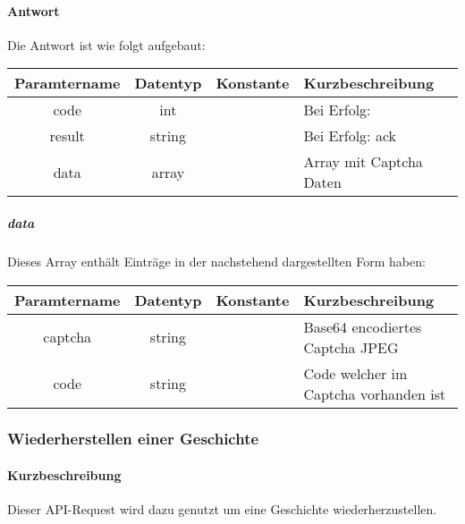 \paragraph{Antwort}Die Antwort ist wie folgt aufgebaut:
\begin{table}[H]
	\begin{tabular}{|c|c|c|p{6.5cm}|}
		\hline
		\textbf{Paramtername} & \textbf{Datentyp} & \textbf{Konstante} & \textbf{Kurzbeschreibung}            \\ \hline                
		code                & int              &                 & Bei Erfolg: {\glqq 0\grqq} \\ \hline
		result              & string           &                 & Bei Erfolg: {\glqq ack\grqq} \\ \hline
		data                & array            &                 & Array mit Captcha Daten \\ \hline
	\end{tabular}
\end{table}
\subparagraph{data}Dieses Array enthält Einträge in der nachstehend dargestellten Form haben:
\begin{table}[H]
	\begin{tabular}{|c|c|c|p{6.5cm}|}
		\hline
		\textbf{Paramtername} & \textbf{Datentyp} & \textbf{Konstante} & \textbf{Kurzbeschreibung}    \\ \hline
		captcha            & string            &                 & Base64 encodiertes Captcha JPEG \\ \hline
		code               & string            &                 & Code welcher im Captcha vorhanden ist \\ \hline
	\end{tabular}
\end{table}
\subsubsection{Wiederherstellen einer Geschichte}
\paragraph{Kurzbeschreibung}Dieser API-Request wird dazu genutzt um eine Geschichte wiederherzustellen.
